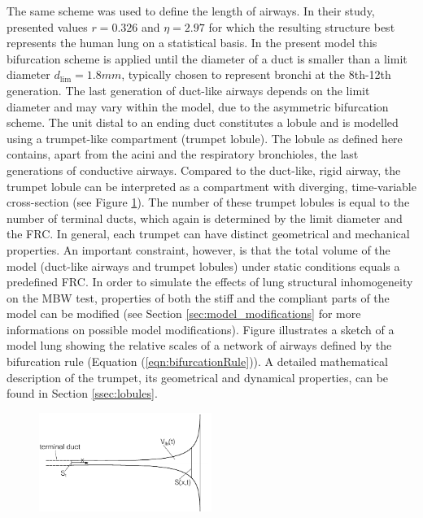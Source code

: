 The same scheme was used to define the length of airways.
In their study, \citet{Majumdar2005} presented values $r = 0.326$ and $\eta = 2.97$ for which the resulting structure best represents the human lung on a statistical basis.
In the present model this bifurcation scheme is applied until the diameter of a duct is smaller than a limit diameter $d_\mathrm{lim} = 1.8 \unit{mm}$, typically chosen to represent bronchi at the 8th-12th generation.
The last generation of duct-like airways depends on the limit diameter and may vary within the model, due to the asymmetric bifurcation scheme.
The unit distal to an ending duct constitutes a lobule and is modelled using a trumpet-like compartment (trumpet lobule).
The lobule as defined here contains, apart from the acini and the respiratory bronchioles, the last generations of conductive airways.
Compared to the duct-like, rigid airway, the trumpet lobule can be interpreted as a compartment with diverging, time-variable cross-section (see Figure \ref{fig:trumpetSketch}).
The number of these trumpet lobules is equal to the number of terminal ducts, which again is determined by the limit diameter and the FRC.
In general, each trumpet can have distinct geometrical and mechanical properties.
An important constraint, however, is that the total volume of the model (duct-like airways and trumpet lobules) under static conditions equals a predefined FRC.
In order to simulate the effects of lung structural inhomogeneity on the MBW test, properties of both the stiff and the compliant parts of the model can be modified (see Section \ref{sec:model_modifications} for more informations on possible model modifications).
Figure illustrates a sketch of a model lung showing the relative scales of a network of airways defined by the bifurcation rule (Equation (\ref{eqn:bifurcationRule})).
A detailed mathematical description of the trumpet, its geometrical and dynamical properties, can be found in Section \ref{ssec:lobules}.

\begin{figure}[tb]
\centering
\includegraphics[width=0.5\textwidth]{figures/trumpetmodel}
\caption{}
\label{fig:trumpetSketch}
\end{figure}


